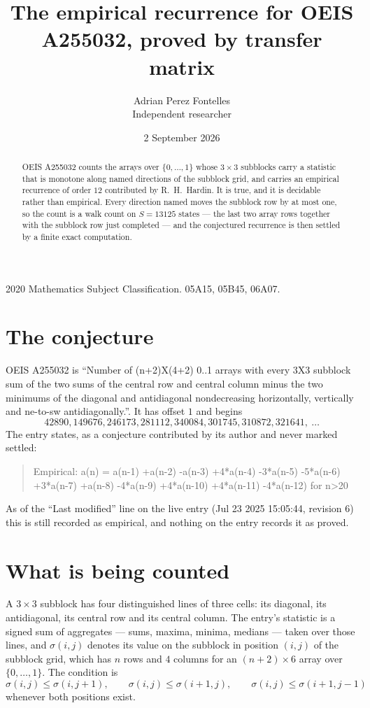 \documentclass[11pt,a4paper]{article}
\title{The empirical recurrence for OEIS A255032, proved by transfer matrix}
\author{Adrian Perez Fontelles\\ \small Independent researcher}
\date{2 September 2026}
\theoremstyle{plain}
\theoremstyle{definition}
\begin{document}
\maketitle

\begin{abstract}
OEIS A255032 counts the arrays over $\{0,\dots,1\}$ whose $3\times3$ subblocks carry a
statistic that is monotone along named directions of the subblock grid, and carries an
empirical recurrence of order $12$ contributed by R.~H.~Hardin. It is true, and it is
decidable rather than empirical. Every direction named moves the subblock row by at most one,
so the count is a walk count on $S=13125$ states --- the last two array rows together with the
subblock row just completed --- and the conjectured recurrence is then settled by a finite
exact computation.
\end{abstract}

\noindent\small 2020 Mathematics Subject Classification. 05A15, 05B45, 06A07.\normalsize

\section{The conjecture}

OEIS A255032 is ``Number of (n+2)X(4+2) 0..1 arrays with every 3X3 subblock sum of the two sums of the central row and central column minus the two minimums of the diagonal and antidiagonal nondecreasing horizontally, vertically and ne-to-sw antidiagonally.''. It has offset $1$ and begins
\[
42890, 149676, 246173, 281112, 340084, 301745, 310872, 321641,\ \dots
\]
The entry states, as a conjecture contributed by its author and never marked settled:
\begin{quote}
Empirical: a(n) = a(n-1) +a(n-2) -a(n-3) +4*a(n-4) -3*a(n-5) -5*a(n-6) +3*a(n-7) +a(n-8) -4*a(n-9) +4*a(n-10) +4*a(n-11) -4*a(n-12) for n>20
\end{quote}
As of the ``Last modified'' line on the live entry (Jul 23 2025 15:05:44, revision 6) this is still
recorded as empirical, and nothing on the entry records it as proved.

\section{What is being counted}

A $3\times3$ subblock has four distinguished lines of three cells: its diagonal, its
antidiagonal, its central row and its central column. The entry's statistic is a signed sum of
aggregates --- sums, maxima, minima, medians --- taken over those lines, and $\sigma(i,j)$
denotes its value on the subblock in position $(i,j)$ of the subblock grid, which has $n$ rows
and $4$ columns for an $(n+2)\times6$ array over $\{0,\dots,1\}$. The condition is
\[
\sigma(i,j)\le\sigma(i,j+1),\qquad \sigma(i,j)\le\sigma(i+1,j),\qquad \sigma(i,j)\le\sigma(i+1,j-1)
\]
whenever both positions exist.
\end{document}
